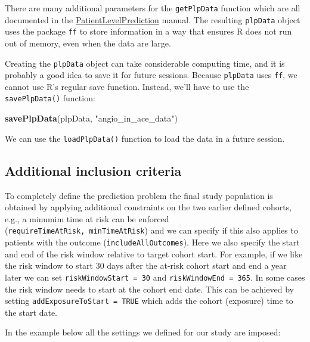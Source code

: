 \documentclass[11pt]{book}
\newenvironment{Shaded}{\begin{snugshade}}{\end{snugshade}}
\newcommand{\KeywordTok}[1]{\textcolor[rgb]{0.13,0.29,0.53}{\textbf{#1}}}
\newcommand{\StringTok}[1]{\textcolor[rgb]{0.31,0.60,0.02}{#1}}
\newcommand{\NormalTok}[1]{#1}
\begin{document}
There are many additional parameters for the \texttt{getPlpData}
function which are all documented in the
\href{https://ohdsi.github.io/PatientLevelPrediction/}{PatientLevelPrediction}
manual. The resulting \texttt{plpData} object uses the package
\texttt{ff} to store information in a way that ensures R does not run
out of memory, even when the data are large.

Creating the \texttt{plpData} object can take considerable computing
time, and it is probably a good idea to save it for future sessions.
Because \texttt{plpData} uses \texttt{ff}, we cannot use R's regular
save function. Instead, we'll have to use the \texttt{savePlpData()}
function:

\begin{Shaded}
\begin{Highlighting}[]
\KeywordTok{savePlpData}\NormalTok{(plpData, }\StringTok{"angio_in_ace_data"}\NormalTok{)}
\end{Highlighting}
\end{Shaded}

We can use the \texttt{loadPlpData()} function to load the data in a
future session.

\subsection{Additional inclusion
criteria}\label{additional-inclusion-criteria}

To completely define the prediction problem the final study population
is obtained by applying additional constraints on the two earlier
defined cohorts, e.g., a minumim time at risk can be enforced
(\texttt{requireTimeAtRisk,\ minTimeAtRisk}) and we can specify if this
also applies to patients with the outcome (\texttt{includeAllOutcomes}).
Here we also specify the start and end of the risk window relative to
target cohort start. For example, if we like the risk window to start 30
days after the at-risk cohort start and end a year later we can set
\texttt{riskWindowStart\ =\ 30} and \texttt{riskWindowEnd\ =\ 365}. In
some cases the risk window needs to start at the cohort end date. This
can be achieved by setting \texttt{addExposureToStart\ =\ TRUE} which
adds the cohort (exposure) time to the start date.

In the example below all the settings we defined for our study are
imposed:
\end{document}
